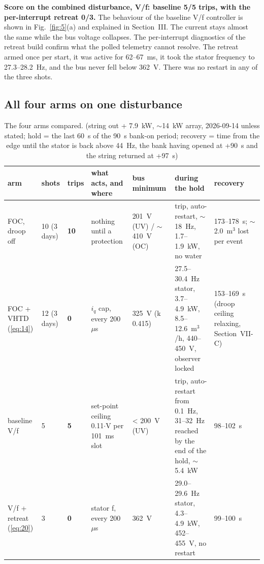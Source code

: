 \documentclass[journal]{IEEEtran}
\begin{document}
\textbf{Score on the combined disturbance, V/f: baseline 5/5 trips, with the per-interrupt retreat 0/3.} The behaviour of the baseline V/f controller is shown in Fig.~\ref{fig:5}(a) and explained in Section~III. The current stays almost the same while the bus voltage collapses. The per-interrupt diagnostics of the retreat build confirm what the polled telemetry cannot resolve. The retreat armed once per start, it was active for 62--67~ms, it took the stator frequency to 27.3--28.2~Hz, and the bus never fell below 362~V. There was no restart in any of the three shots.

\subsection{All four arms on one disturbance}

\begin{table}[!t]\caption{The four arms compared. (string out + 7.9~kW, $\sim$14~kW array, 2026-09-14 unless stated; hold = the last 60~s of the 90~s bank-on period; recovery = time from the edge until the stator is back above 44~Hz, the bank having opened at +90~s and the string returned at +97~s)}\label{tab:4}\centering\scriptsize\setlength{\tabcolsep}{3pt}\renewcommand{\arraystretch}{0.9}
\begin{tabularx}{\textwidth}{llXXXXX}\toprule
arm & shots & trips & what acts, and where & bus minimum & during the hold & recovery \\
\midrule
FOC, droop off & 10 (3 days) & \textbf{10} & nothing until a protection & 201~V (UV) / $\sim$410~V (OC) & trip, auto-restart, $\sim$18~Hz, 1.7--1.9~kW, no water & 173--178~s; $\sim$2.0~m$^{3}$ lost per event \\
FOC + VHTD (\ref{eq:14}) & 12 (3 days) & \textbf{0} & $i_q$ cap, every 200~$\mu$s & 325~V (k 0.415) & 27.5--30.4~Hz stator, 3.7--4.9~kW, 8.5--12.6~m$^{3}$/h, 440--450~V, observer locked & 153--169~s (droop ceiling relaxing, Section~VII-C) \\
baseline V/f & 5 & \textbf{5} & set-point ceiling 0.11$\cdot$V per 101~ms slot & < 200~V (UV) & trip, auto-restart from 0.1~Hz, 31--32~Hz reached by the end of the hold, $\sim$5.4~kW & 98--102~s \\
V/f + retreat (\ref{eq:20}) & 3 & \textbf{0} & stator f, every 200~$\mu$s & 362~V & 29.0--29.6~Hz stator, 4.3--4.9~kW, 452--455~V, no restart & 99--100~s \\
\bottomrule\end{tabularx}\end{table}
\end{document}
